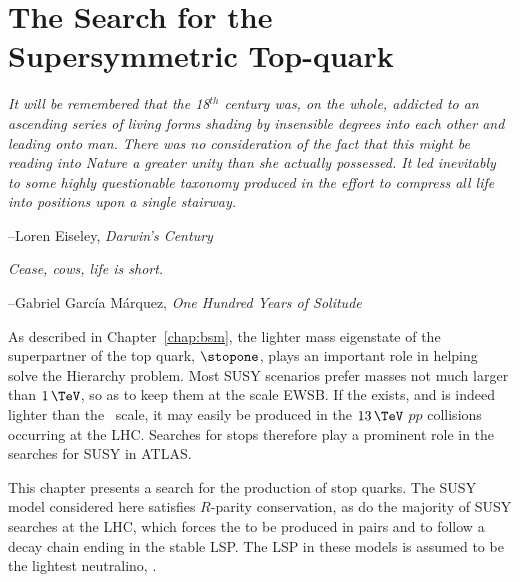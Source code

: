 \chapter{The Search for the Supersymmetric Top-quark}
\label{chap:search_stop}

\epigraph{
\textit{It will be remembered that the 18$^{th}$ century was, on the whole,
addicted to an ascending series of living forms shading by insensible degrees
into each other and leading onto man.
There was no consideration of the fact that this might be reading into Nature a greater
unity than she actually possessed. It led inevitably to some highly
questionable taxonomy produced in the effort to compress all life into positions upon a
single stairway.}
}
{
--Loren Eiseley, \textit{Darwin's Century}
}

\epigraph{
\textit{Cease, cows, life is short.}
}
{
--Gabriel Garc\'{i}a M\'{a}rquez, \textit{One Hundred Years of Solitude}
}


As described in Chapter~\ref{chap:bsm}, the lighter mass eigenstate of the superpartner of
the top quark, $\stopone$, plays an important role in helping solve the Hierarchy problem.
Most SUSY scenarios prefer \stopone masses not much larger than $1\,\TeV$, so as to keep them
at the scale EWSB.
If the \stopone exists, and is indeed lighter than the \TeV~scale, it may easily be produced in the $13\,\TeV$ $pp$ collisions
occurring at the LHC.
Searches for stops therefore play a prominent role in the searches for SUSY in ATLAS.

This chapter presents a search for the production of stop quarks.
The SUSY model considered here satisfies $R$-parity conservation, as do the majority of SUSY
searches at the LHC, which forces the \stopone to be produced in pairs and to follow
a decay chain ending in the stable LSP.
The LSP in these models is assumed to be the lightest neutralino, \ninoone.

